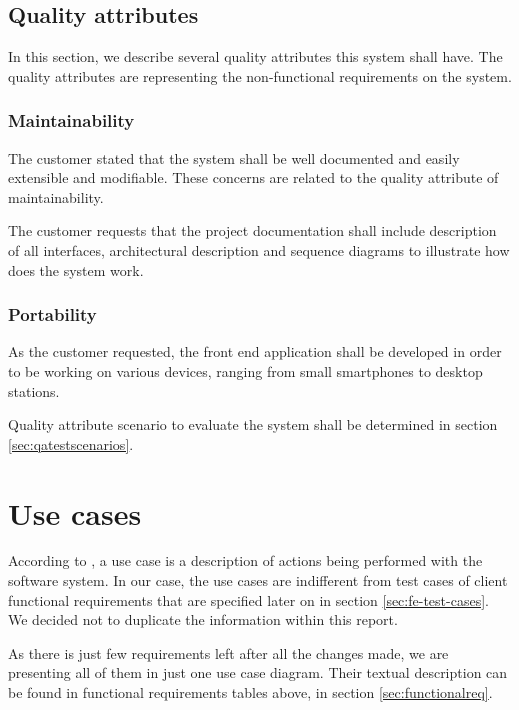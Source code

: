 \documentclass[11pt]{book}
\begin{document}
\subsection{Quality attributes}\label{sec:req_software_system_attributes}
In this section, we describe several quality attributes this system shall have. The quality attributes are representing the non-functional requirements on the system.

\subsubsection{Maintainability}\label{sec:req_software_system_attributes_maintainability}
The customer stated that the system shall be well documented and easily extensible and modifiable. These concerns are related to the quality attribute of maintainability.

The customer requests that the project documentation shall include description of all interfaces, architectural description and sequence diagrams to illustrate how does the system work.

\subsubsection{Portability}\label{sec:req_software_system_attributes_portability}
As the customer requested, the front end application shall be developed in order to be working on various devices, ranging from small smartphones to desktop stations.

Quality attribute scenario to evaluate the system shall be determined in section \ref{sec:qatestscenarios}.


\section{Use cases}
According to \cite{usecases}, a use case is a description of actions being performed with the software system. In our case, the use cases are indifferent from test cases of client functional requirements that are specified later on in section \ref{sec:fe-test-cases}. We decided not to duplicate the information within this report.

As there is just few requirements left after all the changes made, we are presenting all of them in just one use case diagram. Their textual description can be found in functional requirements tables above, in section \ref{sec:functionalreq}.
\end{document}
